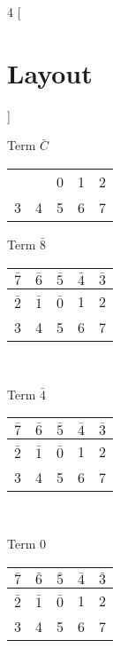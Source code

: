 \documentclass[12 pt]{article}%
\begin{document}
\begin{multicols}{4}
  [ \section{Layout} ]

  \begin{center}
    Term $\bar C$ \\
    \begin{tabular}{|c|c|c|c|c|}
      \hline
      & & & & \\
      \hline
      & & 0 & 1 & 2\\
      \hline
      3 & 4 & 5 & 6 & 7\\
      \hline
    \end{tabular}
    \bigskip

    Term $\bar 8$ \\
    \begin{tabular}{|c|c|c|c|c|}
      \hline
      $ \bar 7 $ & $ \bar 6 $ & $ \bar 5 $ & $\bar 4$ & $\bar 3 $ \\
      \hline
      $ \bar 2 $ & $ \bar 1 $ & $ \bar 0 $ & 1 & 2\\
      \hline
      3 & 4 & 5 & 6 & 7 \\
      \hline
    \end{tabular}\\
    \bigskip

    Term $\bar 4$ \\
    \begin{tabular}{|c|c|c|c|c|}
      \hline
      $ \bar 7 $ & $ \bar 6 $ & $ \bar 5 $ & $\bar 4$ & $\bar 3 $ \\
      \hline
      $ \bar 2 $ & $ \bar 1 $ & $ \bar 0 $ & 1 & 2\\
      \hline
      3 & 4 & 5 & 6 & 7 \\
      \hline
    \end{tabular}\\
    \bigskip

    Term 0 \\
    \begin{tabular}{|c|c|c|c|c|}
      \hline
      $ \bar 7 $ & $ \bar 6 $ & $ \bar 5 $ & $\bar 4$ & $\bar 3 $ \\
      \hline
      $ \bar 2 $ & $ \bar 1 $ & $ \bar 0 $ & 1 & 2\\
      \hline
      3 & 4 & 5 & 6 & 7 \\
      \hline
    \end{tabular}\\
    \bigskip


\end{center}
\end{multicols}
\end{document}
